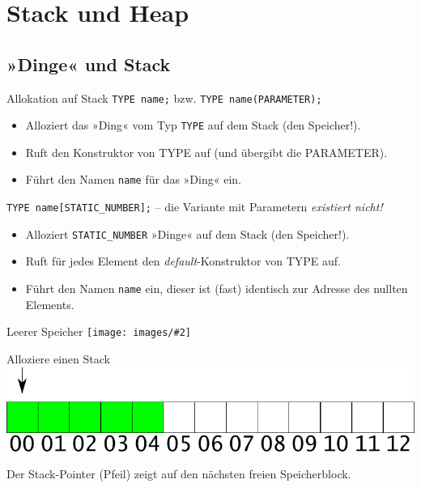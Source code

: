 \section{Stack und Heap}

\subsection{»Dinge« und Stack}

\newcommand{\stackimgframe}[3]{
	\begin{frame}[t]{#1}
		\texttt{[image: images/\#2]}
		
		\begin{block}{}
			#3
		\end{block}
	\end{frame}
}

\begin{frame}[fragile]{Allokation auf Stack}
	\verb|TYPE name;| \hspace{1em} bzw. \hspace{1em} \verb|TYPE name(PARAMETER);|
	\begin{itemize}
		\item Alloziert das »Ding« vom Typ \verb|TYPE| auf dem Stack (den Speicher!).
		\item Ruft den Konstruktor von TYPE auf (und übergibt die PARAMETER).
		\item Führt den Namen \verb|name| für das »Ding« ein.
	\end{itemize}
	
	\vspace{2em}
	
	\verb|TYPE name[STATIC_NUMBER];| -- die Variante mit Parametern \emph{existiert nicht!}
	\begin{itemize}
		\item Alloziert \verb|STATIC_NUMBER| »Dinge« auf dem Stack (den Speicher!).
		\item Ruft für jedes Element den \emph{default}-Konstruktor von TYPE auf.
		\item Führt den Namen \verb|name| ein, dieser ist (fast) identisch zur Adresse des nullten Elements.
	\end{itemize}
\end{frame}

\stackimgframe{Leerer Speicher}{free}{}

\begin{frame}[fragile, t]{Alloziere einen Stack}
	\includegraphics[width=\linewidth]{images/stack_frag_alloc}
	
	\begin{block}{}
		
	\end{block}
	
	Der Stack-Pointer (Pfeil) zeigt auf den nächsten freien Speicherblock.
\end{frame}

